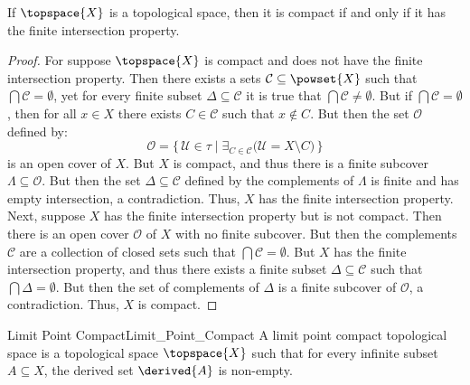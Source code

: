 \documentclass{book}                                                           %
\begin{document}
            \begin{theorem}
                If $\topspace{X}$ is a topological space, then it is compact if and
                only if it has the finite intersection property.
            \end{theorem}
            \begin{proof}
                For suppose $\topspace{X}$ is compact and does not have the finite
                intersection property. Then there exists a sets
                $\mathcal{C}\subseteq\powset{X}$ such that
                $\bigcap\mathcal{C}=\emptyset$, yet for every finite subset
                $\Delta\subseteq\mathcal{C}$ it is true that
                $\bigcap\mathcal{C}\ne\emptyset$. But if
                $\bigcap\mathcal{C}=\emptyset$, then for all $x\in{X}$ there exists
                $C\in\mathcal{C}$ such that $x\notin{C}$. But then the set
                $\mathcal{O}$ defined by:
                \begin{equation}
                    \mathcal{O}=\big\{\,\mathcal{U}\in\tau\;|\;
                        \exists_{C\in\mathcal{C}}
                        \big(\mathcal{U}=X\setminus{C}\big)\,\big\}
                \end{equation}
                is an open cover of $X$. But $X$ is compact, and thus there is a
                finite subcover $\Lambda\subseteq\mathcal{O}$. But then the set
                $\Delta\subseteq\mathcal{C}$ defined by the complements of $\Lambda$
                is finite and has empty intersection, a contradiction. Thus,
                $X$ has the finite intersection property. Next, suppose $X$ has the
                finite intersection property but is not compact. Then there is an
                open cover $\mathcal{O}$ of $X$ with no finite subcover. But
                then the complements $\mathcal{C}$ are a collection of closed sets
                such that $\bigcap\mathcal{C}=\emptyset$. But $X$ has the finite
                intersection property, and thus there exists a finite subset
                $\Delta\subseteq\mathcal{C}$ such that $\bigcap\Delta=\emptyset$.
                But then the set of complements of $\Delta$ is a finite subcover
                of $\mathcal{O}$, a contradiction. Thus, $X$ is compact.
            \end{proof}
            \begin{fdefinition}{Limit Point Compact}{Limit_Point_Compact}
                A limit point compact topological space is a topological space
                $\topspace{X}$ such that for every infinite subset $A\subseteq{X}$,
                the derived set $\derived{A}$ is non-empty.
            \end{fdefinition}
\end{document}

